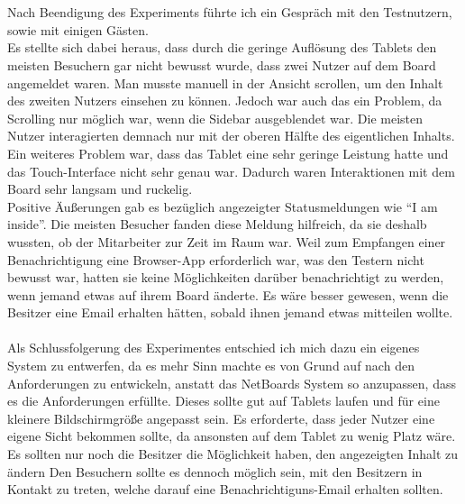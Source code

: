 \\
\\
Nach Beendigung des Experiments führte ich ein Gespräch mit den Testnutzern, sowie mit einigen Gästen.
\\
Es stellte sich dabei heraus, dass durch die geringe Auflösung des Tablets den meisten Besuchern gar nicht bewusst wurde, dass zwei Nutzer auf dem Board angemeldet waren. Man musste manuell in der Ansicht scrollen, um den Inhalt des zweiten Nutzers einsehen zu können. Jedoch war auch das ein Problem, da Scrolling nur möglich war, wenn die Sidebar ausgeblendet war. Die meisten Nutzer interagierten demnach nur mit der oberen Hälfte des eigentlichen Inhalts.
\\
Ein weiteres Problem war, dass das Tablet eine sehr geringe Leistung hatte und das Touch-Interface nicht sehr genau war. Dadurch waren Interaktionen mit dem Board sehr langsam und ruckelig.
\\
Positive Äußerungen gab es bezüglich angezeigter Statusmeldungen wie \bspw ``I am inside''. Die meisten Besucher fanden diese Meldung hilfreich, da sie deshalb wussten, ob der Mitarbeiter zur Zeit im Raum war.
Weil zum Empfangen einer Benachrichtigung eine Browser-App erforderlich war, was den Testern nicht bewusst war, hatten sie keine Möglichkeiten darüber benachrichtigt zu werden, wenn jemand etwas auf ihrem Board änderte. Es wäre besser gewesen, wenn die Besitzer eine Email erhalten hätten, sobald ihnen jemand etwas mitteilen wollte.
\\
\\
Als Schlussfolgerung des Experimentes entschied ich mich dazu ein eigenes System zu entwerfen, da es mehr Sinn machte es von Grund auf nach den Anforderungen zu entwickeln, anstatt das NetBoards System so anzupassen, dass es die Anforderungen erfüllte.
Dieses sollte gut auf Tablets laufen und für eine kleinere Bildschirmgröße angepasst sein. Es erforderte, dass jeder Nutzer eine eigene Sicht bekommen sollte, da ansonsten auf dem Tablet zu wenig Platz wäre.
Es sollten nur noch die Besitzer die Möglichkeit haben, den angezeigten Inhalt zu ändern
Den Besuchern sollte es dennoch möglich sein, mit den Besitzern in Kontakt zu treten, welche darauf eine Benachrichtiguns-Email erhalten sollten.